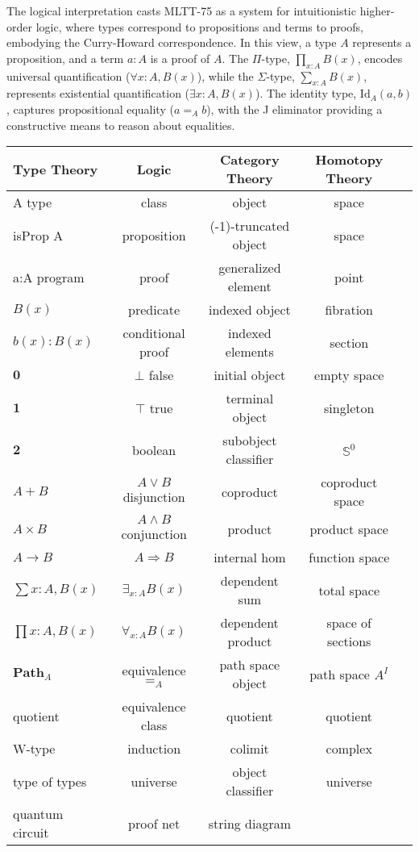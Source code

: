 \documentclass{article}
\begin{document}
The logical interpretation casts MLTT-75 as a system for
intuitionistic higher-order logic, where types correspond
to propositions and terms to proofs, embodying the Curry-Howard
correspondence. In this view, a type $A$ represents a proposition,
and a term $a : A$ is a proof of $A$. The $\Pi$-type, $\prod_{x:A} B(x)$,
encodes universal quantification ($\forall x : A, B(x)$),
while the $\Sigma$-type, $\sum_{x:A} B(x)$, represents existential
quantification ($\exists x : A, B(x)$). The identity type, $\text{Id}_A(a, b)$,
captures propositional equality ($a =_A b$), with the J eliminator providing a
constructive means to reason about equalities.

\begin{table}[!ht]
  \begin{tabular}{lcccc}
    \hline
       Type Theory & Logic & Category Theory & Homotopy Theory\\
    \hline
       A type & class & object & space \\
       isProp A & proposition & (-1)-truncated object & space \\
       a:A program & proof & generalized element & point \\
       $B(x)$ & predicate & indexed object & fibration \\
       $b(x) : B(x)$ & conditional proof & indexed elements & section\\
       $\mathbf{0}$ & $\bot$ false & initial object & empty space \\
       $\mathbf{1}$ & $\top$ true & terminal object & singleton \\
       $\mathbf{2}$ & boolean & subobject classifier & $\mathbb{S}^0$ \\
       $A + B$ & $A\vee B$ disjunction & coproduct & coproduct space \\
       $A\times B$ & $A\wedge B$ conjunction & product & product space \\
       $A\to B$ & $A\Rightarrow B$ & internal hom & function space \\
       $\sum{x:A},B(x)$ & $\exists_{x:A}B(x)$ & dependent sum & total space \\
       $\prod{x:A},B(x)$ & $\forall_{x:A}B(x)$ & dependent product & space of sections\\
       $\mathbf{Path}_{A}$ & equivalence $=_A$ & path space object & path space $A^I$ \\
       quotient & equivalence class & quotient & quotient \\
       W-type & induction & colimit & complex\\
       type of types & universe & object classifier & universe \\
       quantum circuit & proof net & string diagram & \\
      \hline
  \end{tabular}
\end{table}
\end{document}
